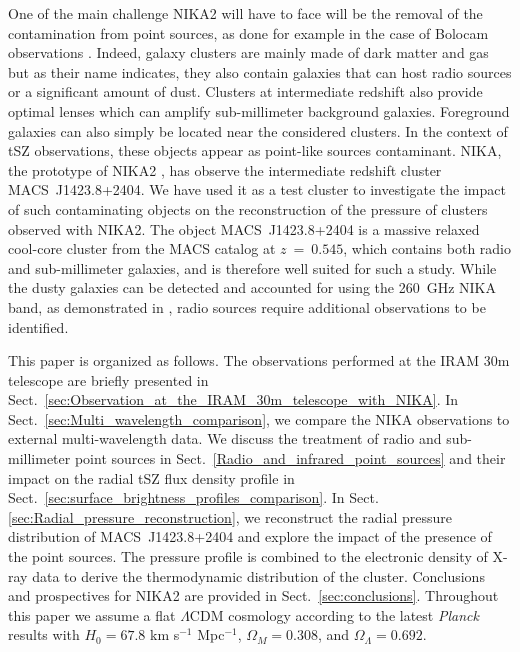 \documentclass[twocolumn,traditabstract]{aa}
\begin{document}
One of the main challenge NIKA2 will have to face will be the removal of the contamination from point sources, as done for example in the case of Bolocam observations \citep{sayers2013a}. Indeed, galaxy clusters are mainly made of dark matter and gas but as their name indicates, they also contain galaxies that can host radio sources or a significant amount of dust. Clusters at intermediate redshift also provide optimal lenses which can amplify sub-millimeter background galaxies. Foreground galaxies can also simply be located near the considered clusters. In the context of tSZ observations, these objects appear as point-like sources contaminant. NIKA, the prototype of NIKA2 \citep[see][for more details on the NIKA camera]{monfardini2010,bourion2011,bourrion2012,monfardini2011,calvo2012,adam2013,catalano2014}, has observe the intermediate redshift cluster \mbox{MACS~J1423.8+2404}. We have used it as a test cluster to investigate the impact of such contaminating objects on the reconstruction of the pressure of clusters observed with NIKA2. The object \mbox{MACS~J1423.8+2404} is a massive relaxed cool-core cluster from the MACS catalog \citep[Massive Cluster Survey,][]{ebeling2001} at $z~=~0.545$, which contains both radio and sub-millimeter galaxies, and is therefore well suited for such a study. While the dusty galaxies can be detected and accounted for using the 260~GHz NIKA band, as demonstrated in \cite{adam2014}, radio sources require additional observations to be identified. 

This paper is organized as follows. The observations performed at the IRAM 30m telescope are briefly presented in Sect.~\ref{sec:Observation_at_the_IRAM_30m_telescope_with_NIKA}. In Sect.~\ref{sec:Multi_wavelength_comparison}, we compare the NIKA observations to external multi-wavelength data. We discuss the treatment of radio and sub-millimeter point sources in Sect.~\ref{Radio_and_infrared_point_sources} and their impact on the radial tSZ flux density profile in Sect.~\ref{sec:surface_brightness_profiles_comparison}. In Sect. \ref{sec:Radial_pressure_reconstruction}, we reconstruct the radial pressure distribution of \mbox{MACS~J1423.8+2404} and explore the impact of the presence of the point sources. The pressure profile is combined to the electronic density of X-ray data to derive the thermodynamic distribution of the cluster. Conclusions and prospectives for NIKA2 are provided in Sect.~\ref{sec:conclusions}. Throughout this paper we assume a flat $\Lambda$CDM cosmology according to the latest {\it Planck} results \citep{planck2014param} with $H_0 = 67.8$ km s$^{-1}$ Mpc$^{-1}$, $\Omega_M = 0.308$, and $\Omega_{\Lambda} = 0.692$.
\end{document}
